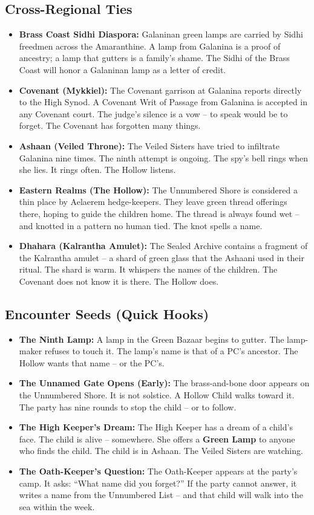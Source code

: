 \subsection*{Cross-Regional Ties}
\begin{itemize}
  \item \textbf{Brass Coast Sidhi Diaspora:} Galaninan green lamps are carried by Sidhi freedmen across the Amaranthine. A lamp from Galanina is a proof of ancestry; a lamp that gutters is a family's shame. The Sidhi of the Brass Coast will honor a Galaninan lamp as a letter of credit.
  \item \textbf{Covenant (Mykkiel):} The Covenant garrison at Galanina reports directly to the High Synod. A Covenant Writ of Passage from Galanina is accepted in any Covenant court. The judge's silence is a vow -- to speak would be to forget. The Covenant has forgotten many things.
  \item \textbf{Ashaan (Veiled Throne):} The Veiled Sisters have tried to infiltrate Galanina nine times. The ninth attempt is ongoing. The spy's bell rings when she lies. It rings often. The Hollow listens.
  \item \textbf{Eastern Realms (The Hollow):} The Unnumbered Shore is considered a thin place by Aelaerem hedge-keepers. They leave green thread offerings there, hoping to guide the children home. The thread is always found wet -- and knotted in a pattern no human tied. The knot spells a name.
  \item \textbf{Dhahara (Kalrantha Amulet):} The Sealed Archive contains a fragment of the Kalrantha amulet -- a shard of green glass that the Ashaani used in their ritual. The shard is warm. It whispers the names of the children. The Covenant does not know it is there. The Hollow does.
\end{itemize}

\subsection*{Encounter Seeds (Quick Hooks)}
\begin{itemize}
\item \textbf{The Ninth Lamp:} A lamp in the Green Bazaar begins to gutter. The lamp-maker refuses to touch it. The lamp's name is that of a PC's ancestor. The Hollow wants that name -- or the PC's.
\item \textbf{The Unnamed Gate Opens (Early):} The brass-and-bone door appears on the Unnumbered Shore. It is not solstice. A Hollow Child walks toward it. The party has nine rounds to stop the child -- or to follow.
\item \textbf{The High Keeper's Dream:} The High Keeper has a dream of a child's face. The child is alive -- somewhere. She offers a \textbf{Green Lamp} to anyone who finds the child. The child is in Ashaan. The Veiled Sisters are watching.
\item \textbf{The Oath-Keeper's Question:} The Oath-Keeper appears at the party's camp. It asks: ``What name did you forget?'' If the party cannot answer, it writes a name from the Unnumbered List -- and that child will walk into the sea within the week.
\end{itemize}

